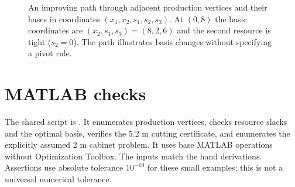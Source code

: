 \documentclass[11pt,a4paper]{article}
\begin{document}
\begin{figure}[H]
  \centering
  \caption{An improving path through adjacent production vertices and their
    bases in coordinates $(x_1,x_2,s_1,s_2,s_3)$. At $(0,8)$ the basic coordinates
    are $(x_2,s_1,s_3)=(8,2,6)$ and the second resource is tight ($s_2=0$).
    The path illustrates basis changes without specifying a pivot rule.}
  \label{fig:basis-path}
\end{figure}

\section{MATLAB checks}\label{sec:matlab}
The shared script is .
It enumerates production vertices, checks resource slacks and the optimal basis,
verifies the 5.2 m cutting certificate, and enumerates the explicitly assumed
2 m cabinet problem. It uses base MATLAB operations without Optimization Toolbox.
The inputs match the hand derivations. Assertions use absolute tolerance
$10^{-10}$ for these small examples; this is not a universal numerical tolerance.
\end{document}
